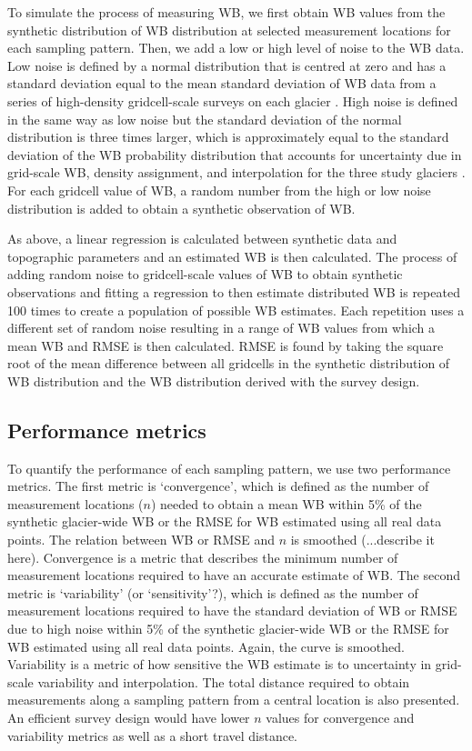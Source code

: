 \documentclass[twocolumn,letterpaper]{igs}
\begin{document}
To simulate the process of measuring WB, we first obtain WB values from the synthetic distribution of WB distribution at selected measurement locations for each sampling pattern. Then, we add a low or high level of noise to the WB data. Low noise is defined by a normal distribution that is centred at zero and has a standard deviation equal to the mean standard deviation of WB data from a series of high-density gridcell-scale surveys on each glacier \citep{Pulwicki2017}. High noise is defined in the same way as low noise but the standard deviation of the normal distribution is three times larger, which is approximately equal to the standard deviation of the WB probability distribution that accounts for uncertainty due in grid-scale WB, density assignment, and interpolation for the three study glaciers \citep{Pulwicki2017}. For each gridcell value of WB, a random number from the high or low noise distribution is added to obtain a synthetic observation of WB.

As above, a linear regression is calculated between synthetic data and topographic parameters and an estimated WB is then calculated. The process of adding random noise to gridcell-scale values of WB to obtain synthetic observations and fitting a regression to then estimate distributed WB is repeated 100 times to create a population of possible WB estimates. Each repetition uses a different set of random noise resulting in a range of WB values from which a mean WB and RMSE is then calculated. RMSE is found by taking the square root of the mean difference between all gridcells in the synthetic distribution of WB distribution and the WB distribution derived with the survey design.
 
 \subsection{Performance metrics}
 
To quantify the performance of each sampling pattern, we use two performance metrics. The first metric is `convergence', which is defined as the number of measurement locations ($n$) needed to obtain a mean WB within 5\% of the synthetic glacier-wide WB or the RMSE for WB estimated using all real data points. The relation between WB or RMSE and $n$ is smoothed (...describe it here). Convergence is a metric that describes the minimum number of measurement locations required to have an accurate estimate of WB. The second metric is `variability' (or `sensitivity'?), which is defined as the number of measurement locations required to have the standard deviation of WB or RMSE due to high noise within 5\% of the synthetic glacier-wide WB or the RMSE for WB estimated using all real data points. Again, the curve is smoothed. Variability is a metric of how sensitive the WB estimate is to uncertainty in grid-scale variability and interpolation. The total distance required to obtain measurements along a sampling pattern from a central location is also presented. An efficient survey design would have lower $n$ values for convergence and variability metrics as well as a short travel distance. 
\end{document}
